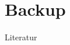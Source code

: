 \section*{Backup}
\begin{frame}[allowframebreaks]{Literatur}
	\nocite{*}
	\printbibliography
\end{frame}
